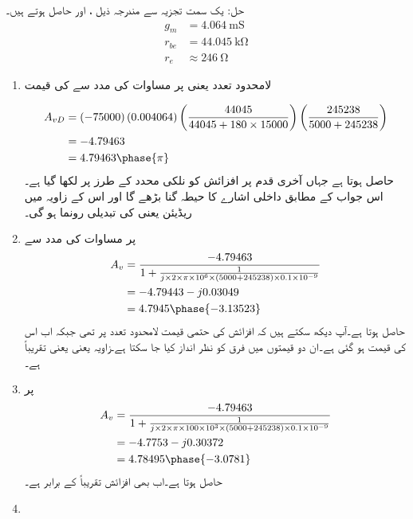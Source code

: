 حل: یک سمت  تجزیہ سے مندرجہ ذیل ،  اور  حاصل ہوتے ہیں۔
\begin{align*}
g_m&=\SI{4.064}{\milli \siemens}\\
r_{be}&=\SI{44.045}{\kilo \ohm}\\
r_e& \approx \SI{246}{\ohm}
\end{align*}
%
\begin{enumerate}
\item
لامحدود تعدد یعنی   پر مساوات   کی مدد سے  کی قیمت

\begin{align*}
A_{vD}&=\left ( -75000 \right ) \left( 0.004064 \right) \left (\frac{44045}{44045+180 \times 15000} \right ) \left (\frac{245238}{5000+245238} \right ) \\ 
&=-4.79463\\
&=4.79463 \phase {\pi}
\end{align*}
حاصل ہوتا ہے جہاں آخری قدم پر افزائش کو نلکی محدد  کے طرز پر لکھا گیا ہے۔اس جواب کے مطابق داخلی اشارے کا حیطہ  گنا بڑھے گا اور اس کے زاویہ میں   ریڈیئن یعنی  کی تبدیلی رونما ہو گی۔
\item
{} پر مساوات   کی مدد سے
\begin{align*}
A_v &=\frac{-4.79463}{1 + \frac{1}{j \times 2 \times \pi \times 10^{6} \times  (5000+245238) \times 0.1 \times 10^{-9}}} \\
&=-4.79443-j 0.03049\\
&=4.7945 \phase {-3.13523}
\end{align*}
حاصل ہوتا ہے۔آپ دیکھ سکتے ہیں کہ افزائش کی حتمی قیمت لامحدود تعدد پر تھی جبکہ اب اس کی قیمت  ہو گئی ہے۔ان دو قیمتوں میں فرق کو نظر انداز کیا جا سکتا ہے۔زاویہ  یعنی یعنی تقریباً  ہے۔
\item
{}	پر
\begin{align*}
A_v &=\frac{-4.79463}{1 + \frac{1}{j \times 2 \times \pi \times 100 \times 10^{3} \times  (5000+245238) \times 0.1 \times 10^{-9}}} \\
&=-4.7753-j 0.30372\\
&=4.78495 \phase {-3.0781}
\end{align*}
حاصل ہوتا ہے۔اب بھی افزائش تقریباً  کے برابر ہے۔
\item

\end{enumerate}
